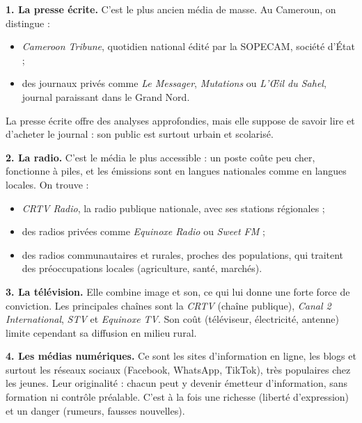 \documentclass[11pt]{article}
\newcommand{\cle}[1]{{\popxbold\color{popdark}#1}}
\begin{document}
\textbf{1. La presse écrite.} C'est le plus ancien média de masse. Au Cameroun, on distingue :
\begin{itemize}
\item \emph{Cameroon Tribune}, quotidien national édité par la SOPECAM, société d'État ;
\item des journaux privés comme \emph{Le Messager}, \emph{Mutations} ou \emph{L'Œil du Sahel}, journal paraissant dans le Grand Nord.
\end{itemize}
La presse écrite offre des analyses approfondies, mais elle suppose de savoir lire et d'acheter le journal : son public est surtout urbain et scolarisé.

\textbf{2. La radio.} C'est le média le plus accessible : un poste coûte peu cher, fonctionne à piles, et les émissions sont en langues nationales comme en langues locales. On trouve :
\begin{itemize}
\item \emph{CRTV Radio}, la radio publique nationale, avec ses stations régionales ;
\item des radios privées comme \emph{Equinoxe Radio} ou \emph{Sweet FM} ;
\item des \cle{radios communautaires et rurales}, proches des populations, qui traitent des préoccupations locales (agriculture, santé, marchés).
\end{itemize}

\textbf{3. La télévision.} Elle combine image et son, ce qui lui donne une forte force de conviction. Les principales chaînes sont la \emph{CRTV} (chaîne publique), \emph{Canal 2 International}, \emph{STV} et \emph{Equinoxe TV}. Son coût (téléviseur, électricité, antenne) limite cependant sa diffusion en milieu rural.

\textbf{4. Les médias numériques.} Ce sont les sites d'information en ligne, les blogs et surtout les \cle{réseaux sociaux} (Facebook, WhatsApp, TikTok), très populaires chez les jeunes. Leur originalité : chacun peut y devenir émetteur d'information, sans formation ni contrôle préalable. C'est à la fois une richesse (liberté d'expression) et un danger (rumeurs, fausses nouvelles).
\end{document}
